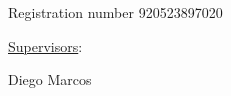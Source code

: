 \documentclass[a4paper, 12pt, oneside]{book} %
\begin{document}
\begin{titlingpage}
  {\Large \theauthor}\vspace{6.0cm}
  
  \vspace{1.5cm}
  
  
  
  \restoregeometry
  \thispagestyle{empty}
  
  \begin{center}
  {\bfseries \Large \thetitle}
  \newline
  \newline
  \newline
  \newline
  
  {\Large \theauthor}\vspace{0.25cm}
  
  {Registration number 920523897020}\vspace{2.5cm}
  
  {\large \underline{Supervisors}:}\vspace{.25cm}
  
  {Diego Marcos}
  

\end{center}
\end{titlingpage}
\end{document}
